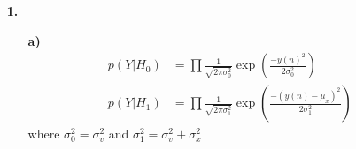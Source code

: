 \documentclass[a4paper,11pt]{article}
\author{\authorinfotitle}
\title{\titleinfo}
\date{\today}
\begin{document}
	\maketitle
	\begin{enumerate}
		\item[\textbf{1.}]
		
		\begin{enumerate}
		\item[\textbf{a)}]
		\begin{align*}
		p(Y|H_0)&=\prod \frac{1}{\sqrt{2\pi\sigma_0^2}}\exp(\frac{-y(n)^2}{2\sigma_0^2}) \\
		p(Y|H_1)&=\prod \frac{1}{\sqrt{2\pi\sigma_1^2}}\exp(\frac{-(y(n)-\mu_x)^2}{2\sigma_1^2})
		\end{align*}
		where $\sigma_0^2 = \sigma_v^2$ and $\sigma_1^2 = \sigma_v^2 + \sigma_x^2$
		\end{enumerate}

	\end{enumerate}
\end{document}
